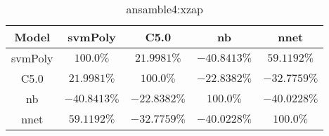 \begin{table}[!ht]
	\centering
	\begin{tabular}{|c|c|c|c|c|}
		\hline
		Model & svmPoly & C5.0 & nb & nnet \\ \hline
		svmPoly & $100.0\%$ & $21.9981\%$ & $-40.8413\%$ & $59.1192\%$ \\ \hline
		C5.0 & $21.9981\%$ & $100.0\%$ & $-22.8382\%$ & $-32.7759\%$ \\ \hline
		nb & $-40.8413\%$ & $-22.8382\%$ & $100.0\%$ & $-40.0228\%$ \\ \hline
		nnet & $59.1192\%$ & $-32.7759\%$ & $-40.0228\%$ & $100.0\%$ \\ \hline
	\end{tabular}
	\caption{ansamble4:xzap}
	\label{tab:ansamble4:xzap}
\end{table}
